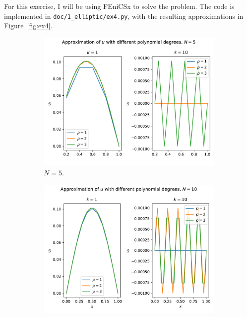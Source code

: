 \begin{solution}
    For this exercise, I will be using FEniCSx to solve the problem.
    The code is implemented in \verb|doc/1_elliptic/ex4.py|, with the resulting approximations in Figure~\ref{fig:ex4}.
    \begin{figure}
        \centering
        \begin{subfigure}[b]{0.45\textwidth}
            \includegraphics[width=\textwidth]{1_elliptic/exercise_1_4_N=5.pdf}
            \caption{$N=5$.\label{fig:ex4_1}}
        \end{subfigure}
        \hfill
        \begin{subfigure}[b]{0.45\textwidth}
            \includegraphics[width=\textwidth]{1_elliptic/exercise_1_4_N=10.pdf}

\end{subfigure}
\end{figure}
\end{solution}
